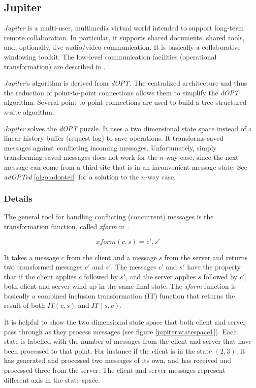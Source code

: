 \subsection{Jupiter}
\label{algo:jupiter}

\emph{Jupiter} is a multi-user, multimedia virtual world intended to support long-term remote collaboration. In particular, it supports shared documents, shared tools, and, optionally, live audio/video communication. It is basically a collaborative windowing toolkit. The low-level communication facilities (operational transformation) are described in \cite{jupiter95}.

\emph{Jupiter}'s algorithm is derived from \emph{dOPT}. The centralized architecture and thus the reduction of point-to-point connections allows them to simplify the \emph{dOPT} algorithm. Several point-to-point connections are used to build a tree-structured $n$-site algorithm.

\emph{Jupiter} solves the \emph{dOPT} puzzle. It uses a two dimensional state space instead of a linear history buffer (request log) to save operations. It transforms saved messages against conflicting incoming messages. Unfortunately, simply transforming saved messages does not work for the $n$-way case, since the next message can come from a third site that is in an inconvenient message state. See \emph{adOPTed} \ref{algo:adopted} for a solution to the $n$-way case.


\subsubsection{Details}

The general tool for handling conflicting (concurrent) messages is the transformation function, called \emph{xform} in \cite{jupiter95}.

$$ xform(c,s)={c',s'} $$

It takes a message $c$ from the client and a message $s$ from the server and returns two transformed messages $c'$ and $s'$. The messages $c'$ and $s'$ have the property that if the client applies $c$ followed by $s'$, and the server applies $s$ followed by $c'$, both client and server wind up in the same final state. The \emph{xform} function is basically a combined inclusion transformation (IT) function that returns the result of both $IT(c,s)$ and $IT(s,c)$.

It is helpful to show the two dimensional state space that both client and server pass through as they process messages (see figure \ref{jupiter:statespace1}). Each state is labelled with the number of messages from the client and server that have been processed to that point. For instance if the client is in the state $(2,3)$, it has generated and processed two messages of its own, and has received and processed three from the server. The client and server messages represent different axis in the state space. 

